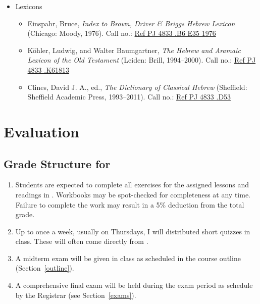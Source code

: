 \documentclass[titlepage]{article}
\begin{document}
\begin{itemize}
  \item Lexicons

    \begin{itemize}
      \item
        Einspahr, Bruce, \emph{Index to Brown, Driver \& Briggs Hebrew
        Lexicon} (Chicago: Moody, 1976). Call no.:
        \href{http://cat.tyndale.ca/vwebv/holdingsInfo?bibId=72788}{Ref PJ 4833 .B6 E35 1976}
      \item
        Köhler, Ludwig, and Walter Baumgartner, \emph{The Hebrew
        and Aramaic Lexicon of the Old Testament} (Leiden: Brill,
        1994--2000). Call no.:
        \href{http://cat.tyndale.ca/vwebv/holdingsInfo?bibId=73713}{Ref PJ 4833 .K61813}
      \item
        Clines, David J. A., ed., \emph{The Dictionary of Classical
        Hebrew} (Sheffield: Sheffield Academic Press, 1993--2011). Call no.:
        \href{http://cat.tyndale.ca/vwebv/holdingsInfo?bibId=72831}{Ref PJ 4833 .D53}
    \end{itemize}

\end{itemize}

\section{Evaluation}
\label{evaluation}

\subsection{Grade Structure for \ccode}
\label{structure}

\begin{enumerate}
 \item
    Students are expected to complete all exercises for the assigned
    lessons and readings in \cite{bbh}. Workbooks may be spot-checked
    for completeness at any time. Failure to complete the work may
    result in a 5\% deduction from the total grade.
  \item
    Up to once a week, usually on Thursdays, I will distributed short
    quizzes in class. These will often come directly from \cite{bbh}.
 \item
   A midterm exam will be given in class as scheduled in the course
   outline (Section~\ref{outline}).
 \item
   A comprehensive final exam will be held during the exam period as
   schedule by the Registrar (see Section~\ref{exams}).
\end{enumerate}
\end{document}
